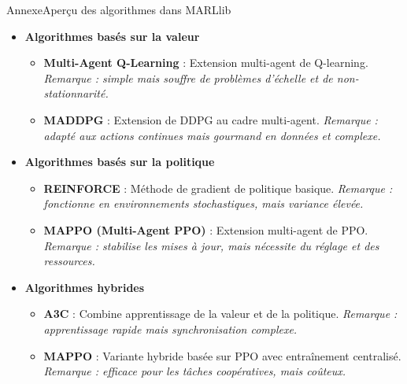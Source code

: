 \begin{frame}[allowframebreaks]{Annexe}{Aperçu des algorithmes dans MARLlib}

    \begin{itemize}
        \item \textbf{Algorithmes basés sur la valeur}
              \begin{itemize}
                  \item \textbf{Multi-Agent Q-Learning} : Extension multi-agent de Q-learning.\newline
                        \textit{Remarque : simple mais souffre de problèmes d’échelle et de non-stationnarité.}
                  \item \textbf{MADDPG} : Extension de DDPG au cadre multi-agent.\newline
                        \textit{Remarque : adapté aux actions continues mais gourmand en données et complexe.}
              \end{itemize}

        \item \textbf{Algorithmes basés sur la politique}
              \begin{itemize}
                  \item \textbf{REINFORCE} : Méthode de gradient de politique basique.\newline
                        \textit{Remarque : fonctionne en environnements stochastiques, mais variance élevée.}
                  \item \textbf{MAPPO (Multi-Agent PPO)} : Extension multi-agent de PPO.\newline
                        \textit{Remarque : stabilise les mises à jour, mais nécessite du réglage et des ressources.}
              \end{itemize}

        \item \textbf{Algorithmes hybrides}
              \begin{itemize}
                  \item \textbf{A3C} : Combine apprentissage de la valeur et de la politique.\newline
                        \textit{Remarque : apprentissage rapide mais synchronisation complexe.}
                  \item \textbf{MAPPO} : Variante hybride basée sur PPO avec entraînement centralisé.\newline
                        \textit{Remarque : efficace pour les tâches coopératives, mais coûteux.}
              \end{itemize}


\end{itemize}
\end{frame}
